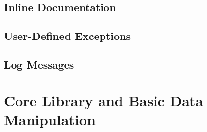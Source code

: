 \documentclass{article}
\begin{document}
\subsection{Inline Documentation}

\subsection{User-Defined Exceptions}

\subsection{Log Messages}

\pagebreak

\section{Core Library and Basic Data Manipulation}
\end{document}
